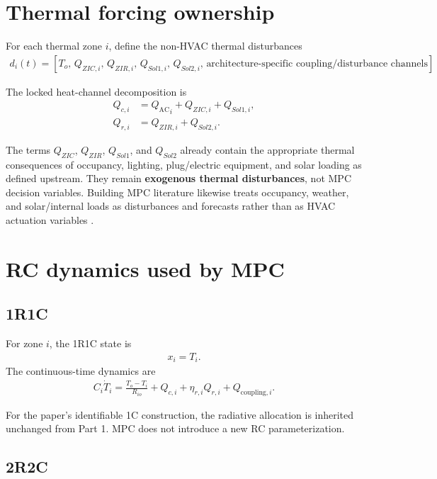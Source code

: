 \documentclass[11pt]{article}
\newcommand{\QAC}{Q_{\mathrm{AC}}}
\begin{document}
\section{Thermal forcing ownership}

For each thermal zone \(i\), define the non-HVAC thermal disturbances
\begin{align}
d_i(t)
=
\left[
T_o,\,
Q_{ZIC,i},\,
Q_{ZIR,i},\,
Q_{Sol1,i},\,
Q_{Sol2,i},\,
\text{architecture-specific coupling/disturbance channels}
\right].
\end{align}

The locked heat-channel decomposition is
\begin{align}
Q_{c,i}
&=
{\QAC}_i
+
Q_{ZIC,i}
+
Q_{Sol1,i},
\tag{6.3}\\
Q_{r,i}
&=
Q_{ZIR,i}
+
Q_{Sol2,i}.
\tag{6.4}
\end{align}

The terms \(Q_{ZIC}\), \(Q_{ZIR}\), \(Q_{Sol1}\), and \(Q_{Sol2}\) already contain the
appropriate thermal consequences of occupancy, lighting, plug/electric equipment, and solar
loading as defined upstream.  They remain \textbf{exogenous thermal disturbances}, not MPC
decision variables.  Building MPC literature likewise treats occupancy, weather, and solar/internal
loads as disturbances and forecasts rather than as HVAC actuation variables
\citep{oldewurtel2013occupancy,killian2016ten,drgona2020all}.

\section{RC dynamics used by MPC}

\subsection{1R1C}

For zone \(i\), the 1R1C state is
\begin{align}
x_i=T_i.
\end{align}
The continuous-time dynamics are
\begin{align}
\boxed{
C_i\dot T_i
=
\frac{T_o-T_i}{R_{io}}
+
Q_{c,i}
+
\eta_{r,i}Q_{r,i}
+
Q_{\mathrm{coupling},i}.
}
\tag{6.5}
\end{align}

For the paper's identifiable 1C construction, the radiative allocation is inherited unchanged
from Part 1.  MPC does not introduce a new RC parameterization.

\subsection{2R2C}
\end{document}

